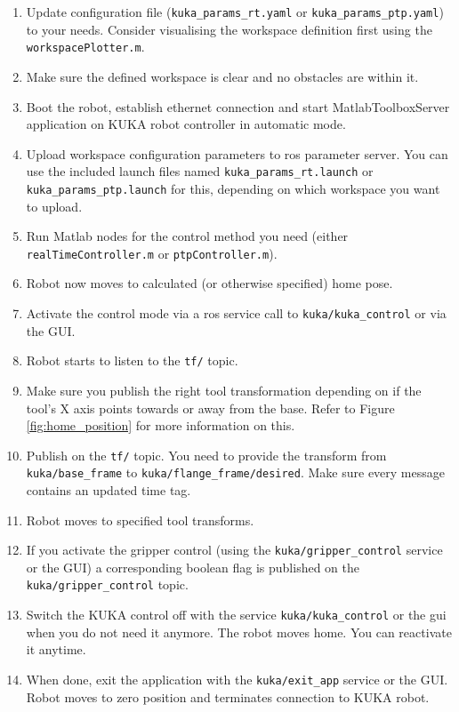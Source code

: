 \documentclass[headsepline,footinclude=false,fontsize=11pt,paper=a4,listof=totoc,bibliography=totoc,BCOR=12mm,DIV=14]{scrbook}
\begin{document}
\begin{enumerate}
	\item Update configuration file (\texttt{kuka\_params\_rt.yaml} or \texttt{kuka\_params\_ptp.yaml}) to your needs. Consider visualising the workspace definition first using the \texttt{workspacePlotter.m}.
	\item Make sure the defined workspace is clear and no obstacles are within it.
 	\item Boot the robot, establish ethernet connection and start MatlabToolboxServer application on KUKA robot controller in automatic mode.
 	\item Upload workspace configuration parameters to \gls{ros} parameter server. You can use the included launch files named \texttt{kuka\_params\_rt.launch} or \texttt{kuka\_params\_ptp.launch} for this, depending on which workspace you want to upload.
	\item Run Matlab nodes for the control method you need (either \texttt{realTimeController.m} or \texttt{ptpController.m}).
	\item Robot now moves to calculated (or otherwise specified) home pose.
	\item Activate the control mode via a \gls{ros} service call to \texttt{kuka/kuka\_control} or via the GUI. 
	\item Robot starts to listen to the \texttt{tf/} topic.
	\item Make sure you publish the right tool transformation depending on if the tool's X axis points towards or away from the base. Refer to Figure \ref{fig:home_position} for more information on this.
	\item Publish on the \texttt{tf/} topic. You need to provide the transform from \texttt{kuka/base\_frame} to \texttt{kuka/flange\_frame/desired}. Make sure every message contains an updated time tag. 
	\item Robot moves to specified tool transforms.
	\item If you activate the gripper control (using the \texttt{kuka/gripper\_control} service or the GUI) a corresponding boolean flag is published on the \texttt{kuka/gripper\_control} topic.
	\item Switch the KUKA control off with the service \texttt{kuka/kuka\_control} or the \gls{gui} when you do not need it anymore. The robot moves home. You can reactivate it anytime. 
	\item When done, exit the application with the \texttt{kuka/exit\_app} service or the GUI. Robot moves to zero position and terminates connection to KUKA robot.
	\end{enumerate}
\end{document}
